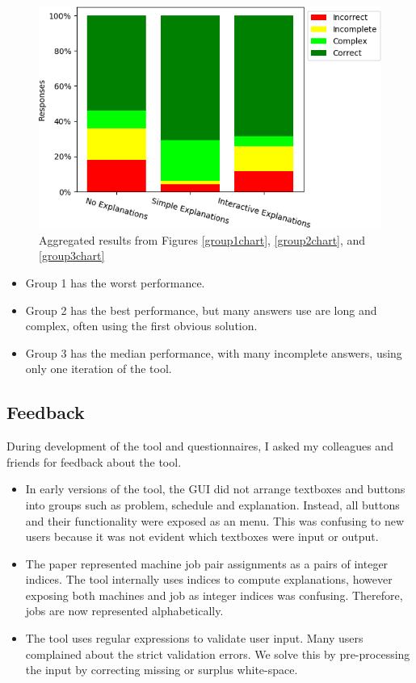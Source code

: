 \begin{figure}[H]
	\begin{center}
		\includegraphics[scale=0.55]{figures/questionnaire_results_summary}
	\end{center}
	\caption{Aggregated results from Figures \ref{group1chart}, \ref{group2chart}, and \ref{group3chart}}
	\label{summarychart}
\end{figure}

\begin{itemize}
	\item Group 1 has the worst performance.
	\item Group 2 has the best performance, but many answers use are long and complex, often using the first obvious solution.
	\item Group 3 has the median performance, with many incomplete answers, using only one iteration of the tool.
\end{itemize}

\subsection{Feedback}

During development of the tool and questionnaires, I asked my colleagues and friends for feedback about the tool.

\begin{itemize}
	\item In early versions of the tool, the GUI did not arrange textboxes and buttons into groups such as problem, schedule and explanation. Instead, all buttons and their functionality were exposed as an menu. This was confusing to new users because it was not evident which textboxes were input or output.
	\item The paper \cite{aes} represented machine job pair assignments as a pairs of integer indices. The tool internally uses indices to compute explanations, however exposing both machines and job as integer indices was confusing. Therefore, jobs are now represented alphabetically.
	\item The tool uses regular expressions to validate user input. Many users complained about the strict validation errors. We solve this by pre-processing the input by correcting missing or surplus white-space.
\end{itemize}